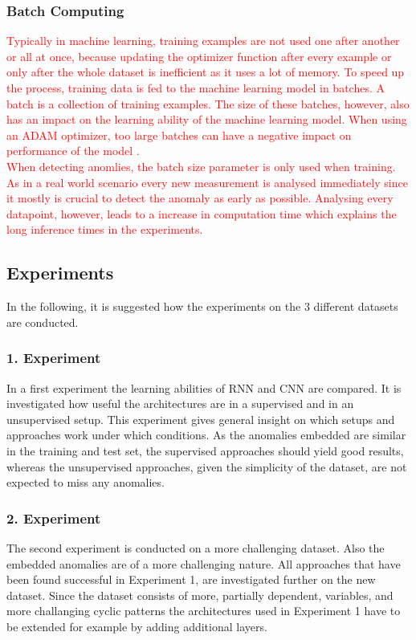 \subsubsection{Batch Computing}
\textcolor{red}{Typically in machine learning, training examples are not used one after another or all at once, because updating the optimizer function after every example or only after the whole dataset is inefficient as it uses a lot of memory. To speed up the process, training data is fed to the machine learning model in batches. A batch is a collection of training examples. The size of these batches, however, also has an impact on the learning ability of the machine learning model. When using an ADAM optimizer, too large batches can have a negative impact on performance of the model \parencite{Krishnan2019}.\\
When detecting anomlies, the batch size parameter is only used when training. As in a real world scenario every new measurement is analysed immediately since it mostly is crucial to detect the anomaly as early as possible. Analysing every datapoint, however, leads to a increase in computation time which explains the long inference times in the experiments.}

\subsection{Experiments}
In the following, it is suggested how the experiments on the 3 different datasets are conducted.

\subsubsection{1. Experiment}
In a first experiment the learning abilities of RNN and CNN are compared. It is investigated how useful the architectures are in a supervised and in an unsupervised setup. This experiment gives general insight on which setups and approaches work under which conditions. As the anomalies embedded are similar in the training and test set, the supervised approaches should yield good results, whereas the unsupervised approaches, given the simplicity of the dataset, are not expected to miss any anomalies.

\subsubsection{2. Experiment}
The second experiment is conducted on a more challenging dataset. Also the embedded anomalies are of a more challenging nature. All approaches that have been found successful in Experiment 1, are investigated further on the new dataset. Since the dataset consists of more, partially dependent, variables, and more challanging cyclic patterns the architectures used in Experiment 1 have to be extended for example by adding additional layers. 

